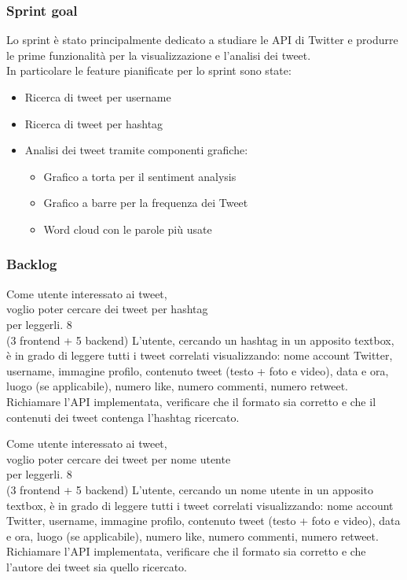 \subsubsection{Sprint goal}
Lo sprint è stato principalmente dedicato a studiare le API di Twitter e produrre le prime funzionalità per la visualizzazione e l'analisi dei tweet.\\
In particolare le feature pianificate per lo sprint sono state:
\begin{itemize}
    \item Ricerca di tweet per username
    \item Ricerca di tweet per hashtag
    \item Analisi dei tweet tramite componenti grafiche:
    \begin{itemize}
        \item Grafico a torta per il sentiment analysis
        \item Grafico a barre per la frequenza dei Tweet
        \item Word cloud con le parole più usate
    \end{itemize}
\end{itemize}


\subsubsection{Backlog}
\userstory%
{Come utente interessato ai tweet,\\voglio poter cercare dei tweet per hashtag\\per leggerli.}%
{8\\(3 frontend + 5 backend)}%
{L'utente, cercando un hashtag in un apposito textbox, è in grado di leggere tutti i tweet correlati visualizzando:
nome account Twitter, username, immagine profilo, contenuto tweet (testo + foto e video), data e ora, luogo (se applicabile), numero like, numero commenti, numero retweet.}%
{Richiamare l'API implementata, verificare che il formato sia corretto e che il contenuti dei tweet contenga l'hashtag ricercato.}

\userstory%
{Come utente interessato ai tweet,\\voglio poter cercare dei tweet per nome utente\\per leggerli.}%
{8\\(3 frontend + 5 backend)}%
{L'utente, cercando un nome utente in un apposito textbox, è in grado di leggere tutti i tweet correlati visualizzando:
nome account Twitter, username, immagine profilo, contenuto tweet (testo + foto e video), data e ora, luogo (se applicabile), numero like, numero commenti, numero retweet.}%
{Richiamare l'API implementata, verificare che il formato sia corretto e che l'autore dei tweet sia quello ricercato.}

